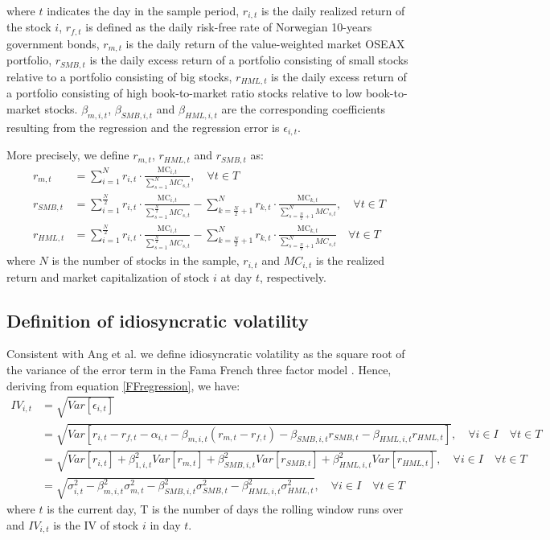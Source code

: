 where $t$ indicates the day in the sample period, $r_{i,t}$ is the daily realized return of the stock $i$, $r_{f,t}$ is defined as the daily risk-free rate of Norwegian 10-years government bonds, $r_{m,t}$ is the daily return of the value-weighted market OSEAX portfolio, $r_{SMB,t}$ is the daily excess return of a portfolio consisting of small stocks relative to a portfolio consisting of big stocks, $r_{HML,t}$ is the daily excess return of a portfolio consisting of high book-to-market ratio stocks relative to low book-to-market stocks. $\beta_{m,i,t}$, $\beta_{SMB,i,t}$ and $\beta_{HML,i,t}$ are the corresponding coefficients resulting from the regression and the regression error is $\epsilon_{i,t}$.

More precisely, we define $r_{m,t}$, $r_{HML,t}$ and $r_{SMB,t}$ as:
\begin{align}
    r_{m,t} &= \sum_{i=1}^{N} r_{i,t} \cdot \frac{\text{MC}_{i,t}}{\sum_{s=1}^{N} MC_{s,t}},  \quad  \forall t \in T \\
    r_{SMB,t} &= \sum_{i=1}^{\frac{N}{2}} r_{i,t} \cdot \frac{\text{MC}_{i,t}}{\sum_{s=1}^{\frac{N}{2}} MC_{s,t}} - \sum_{k=\frac{N}{2}+1}^{N} r_{k,t} \cdot \frac{\text{MC}_{k,t}}{\sum_{s={\frac{N}{2}+1}}^{N} MC_{s,t}}, \quad  \forall t \in T \\
    r_{HML,t} &= \sum_{i=1}^{\frac{N}{2}} r_{i,t} \cdot \frac{\text{MC}_{i,t}}{\sum_{s=1}^{\frac{N}{2}} MC_{s,t}} - \sum_{k=\frac{N}{2}+1}^{N} r_{k,t} \cdot \frac{\text{MC}_{k,t}}{\sum_{s=\frac{N}{2}+1}^{N} MC_{s,t}} \quad  \forall t \in T
\end{align}
where $N$ is the number of stocks in the sample, $r_{i,t}$ and $MC_{i,t}$ is the realized return and market capitalization of stock $i$ at day $t$, respectively. 

\subsection{Definition of idiosyncratic volatility}
Consistent with Ang et al. \cite{angetal06} we define idiosyncratic volatility as the square root of the variance of the error term in the Fama French three factor model \cite{famafrench}. Hence, deriving from equation \ref{FFregression}, we have:
 \begin{align}
 IV_{i,t} &= \sqrt{Var[\epsilon_{i,t}]} \\
  &= \sqrt{Var[r_{i,t} - r_{f,t}- \alpha_{i,t}-\beta_{m,i,t}(r_{m,t} - r_{f,t}) - \beta_{SMB,i,t}r_{SMB,t} - \beta_{HML,i,t}r_{HML,t}]},  \quad  \forall i \in I \quad  \forall t \in T \\
 &= \sqrt{Var[r_{i,t}]+\beta_{1,i,t}^2Var[r_{m,t}]+\beta_{SMB,i,t}^2Var[r_{SMB,t}]+\beta_{HML,i,t}^2Var[r_{HML,t}]}, \quad  \forall i \in I \quad  \forall t \in T \\ 
 &= \sqrt{\sigma_{i,t}^2 - \beta^2_{m,i,t} \sigma_{m,t}^{2}- \beta^2_{SMB,i,t} \sigma_{SMB,t}^{2}- \beta^2_{HML,i,t} \sigma_{HML,t}^{2}}, \quad  \forall i \in I \quad  \forall t \in T
 \end{align}
where $t$ is the current day, T is the number of days the rolling window runs over and $IV_{i,t}$ is the IV of stock $i$ in day $t$. 

